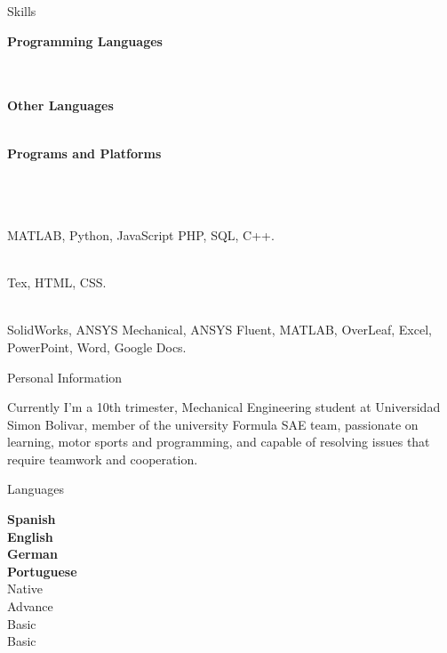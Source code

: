 \documentclass[10pt]{article}
\begin{document}
\begin{multicols}{2}
    \begin{LARGE}
        \color{blue!50!black}Skills\par
    \end{LARGE}
    \begin{vwcol}[widths={0.4,0.6},
 sep=0cm,rule=0pt,indent=0em,lines=9]
        \textbf{Programming Languages}\par\hfill\\\hfill\\
        \textbf{Other Languages}\par\hfill\\
        \textbf{Programs and Platforms}\par\hfill\\\hfill\\\hfill\\
        MATLAB, Python, JavaScript PHP, SQL, C++.\par\hfill\\
        Tex, HTML, CSS.\par\hfill\\
        SolidWorks, ANSYS Mechanical, ANSYS Fluent, MATLAB, OverLeaf, Excel, PowerPoint, Word, Google Docs.\par
    \end{vwcol}
    \columnbreak
    \begin{LARGE}
        \color{blue!50!black} Personal Information\par
    \end{LARGE}
    Currently I'm a 10th trimester, Mechanical Engineering student at Universidad Simon Bolivar, member of the university Formula SAE team, passionate on learning, motor sports and programming, and capable of resolving issues that require teamwork and cooperation.\par
    \begin{LARGE}
        \color{blue!50!black} Languages\par
    \end{LARGE}
    \begin{vwcol}[widths={0.235,0.765},
 sep=.8cm,rule=0pt,indent=0em,lines=4]
        \textbf{Spanish}\\
        \textbf{English}\\
        \textbf{German}\\
        \textbf{Portuguese}\\
        Native\\
        Advance\\
        Basic\\
        Basic\\
    \end{vwcol}
\end{multicols}
\end{document}
